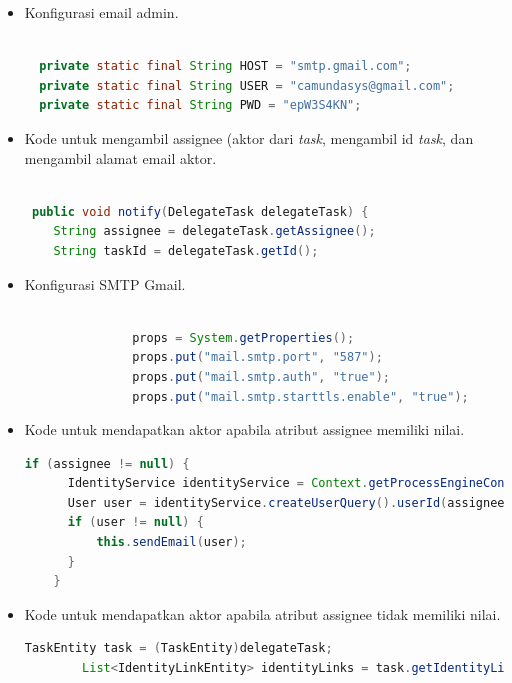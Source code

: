 \begin{itemize}
	\item Konfigurasi email admin.
\begin{lstlisting}[language=Java,basicstyle=\tiny,caption=TaskAssignmentListener.java]

  private static final String HOST = "smtp.gmail.com";
  private static final String USER = "camundasys@gmail.com";
  private static final String PWD = "epW3S4KN";
\end{lstlisting}
	

	\item Kode untuk mengambil assignee (aktor dari \textit{task}, mengambil id \textit{task}, dan mengambil alamat email aktor.
	\begin{lstlisting}[language=Java,basicstyle=\tiny,caption=TaskAssignmentListener.java]

 public void notify(DelegateTask delegateTask) {
    String assignee = delegateTask.getAssignee();
    String taskId = delegateTask.getId();
\end{lstlisting}

	\item Konfigurasi SMTP Gmail.
	\begin{lstlisting}[language=Java,basicstyle=\tiny,caption=TaskAssignmentListener.java]

               props = System.getProperties();
               props.put("mail.smtp.port", "587");
               props.put("mail.smtp.auth", "true");
               props.put("mail.smtp.starttls.enable", "true");

\end{lstlisting}
	\item Kode untuk mendapatkan aktor apabila atribut assignee memiliki nilai.
	\begin{lstlisting}[language=Java,basicstyle=\tiny,caption =TaskAssignmentListener.java]
	if (assignee != null) {
      IdentityService identityService = Context.getProcessEngineConfiguration().getIdentityService();
      User user = identityService.createUserQuery().userId(assignee).singleResult();
      if (user != null) {
    	  this.sendEmail(user);
      }
    }
	\end{lstlisting}
	
		\item Kode untuk mendapatkan aktor apabila atribut assignee tidak memiliki nilai.
	\begin{lstlisting}[language=Java,basicstyle=\tiny,caption =TaskAssignmentListener.java]
	    	TaskEntity task = (TaskEntity)delegateTask;
    	List<IdentityLinkEntity> identityLinks = task.getIdentityLinks();
    	

\end{lstlisting}
\end{itemize}
